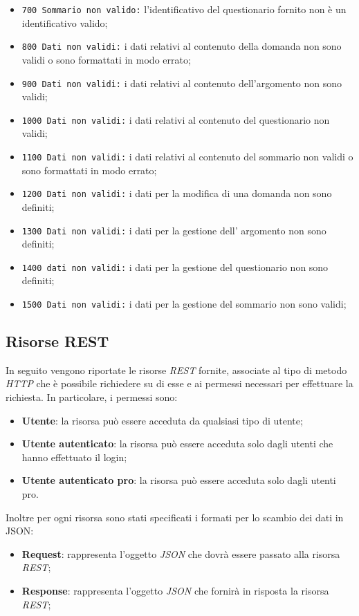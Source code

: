 \begin{itemize}
	\item \texttt{700 Sommario non valido:} l'identificativo del questionario fornito non è un identificativo valido;
	\item \texttt{800 Dati non validi:} i dati relativi al contenuto della domanda non sono  validi o sono formattati in modo errato;
	\item \texttt{900 Dati non validi:} i dati relativi al contenuto dell'argomento non sono validi;
	\item \texttt{1000 Dati non validi:} i dati relativi al contenuto del questionario non validi;
	\item \texttt{1100 Dati non validi:} i dati relativi al contenuto del  sommario non validi o sono formattati in modo errato;
	\item \texttt{1200 Dati non validi:} i dati per la modifica di una domanda non sono definiti;
	\item \texttt{1300 Dati non validi:} i dati per la gestione dell' argomento non sono definiti;
	\item \texttt{1400 dati non validi:} i dati per la gestione del questionario non sono definiti;
	\item \texttt{1500 Dati non validi:} i dati per la gestione del sommario non sono validi;
\end{itemize}

\subsection{Risorse REST}
In seguito vengono riportate le risorse \textit{REST} fornite, associate al tipo di metodo \textit{HTTP} che è possibile richiedere su di esse e ai permessi necessari per effettuare la richiesta. In particolare, i permessi sono:
\begin{itemize}
	\item \textbf{Utente}: la risorsa può essere acceduta da qualsiasi tipo di utente;
	\item \textbf{Utente autenticato}: la risorsa può essere acceduta solo dagli utenti che hanno effettuato il login;
	\item \textbf{Utente autenticato pro}: la risorsa può essere acceduta solo dagli utenti pro.
\end{itemize}
Inoltre per ogni risorsa sono stati specificati i formati per lo scambio dei dati in JSON:
\begin{itemize}
	\item \textbf{Request}: rappresenta l'oggetto \textit{JSON} che dovrà essere passato alla risorsa \textit{REST};
	\item \textbf{Response}: rappresenta l'oggetto \textit{JSON} che fornirà in risposta la risorsa \textit{REST};
	
	
	
	
	
	
	
	
	
\end{itemize}